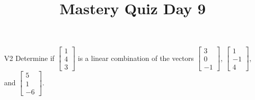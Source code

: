 \documentclass{sbgLAquiz}
\title{Mastery Quiz Day 9 }
\begin{document}
\begin{problem}{V2} Determine if $\begin{bmatrix} 1 \\ 4 \\ 3 \end{bmatrix}$ is a linear combination of the vectors $\begin{bmatrix} 3 \\ 0 \\ -1 \end{bmatrix}$, $\begin{bmatrix} 1 \\ -1 \\ 4 \end{bmatrix}$, and $\begin{bmatrix} 5 \\ 1 \\  -6 \end{bmatrix}$.
\end{problem}
\end{document}
